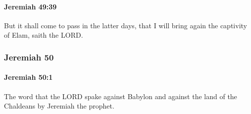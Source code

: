 		\paragraph{Jeremiah 49:39} %
			\label{JEREMIAH-49-39}

			But it shall come to pass in the latter days, that I will bring again the captivity of Elam, saith the LORD.

	\subsubsection{Jeremiah 50} %
		\label{JEREMIAH-50}

		\paragraph{Jeremiah 50:1} %
			\label{JEREMIAH-50-1}

			The word that the LORD spake against Babylon and against the land of the Chaldeans by Jeremiah the prophet.

